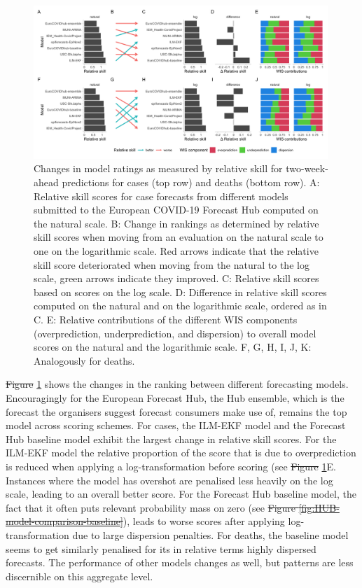 \documentclass[10pt,letterpaper]{article} %
\providecommand{\DIFaddtex}[1]{{\protect\color{blue}\uwave{#1}}} %
\providecommand{\DIFdeltex}[1]{{\protect\color{red}\sout{#1}}}                      %
\providecommand{\DIFaddbegin}{} %
\providecommand{\DIFaddend}{} %
\providecommand{\DIFdelbegin}{} %
\providecommand{\DIFdelend}{} %
\providecommand{\DIFadd}[1]{\texorpdfstring{\DIFaddtex{#1}}{#1}} %
\providecommand{\DIFdel}[1]{\texorpdfstring{\DIFdeltex{#1}}{}} %
\newcommand{\DIFscaledelfig}{0.5}
\newlength{\DIFdelgraphicswidth} %
\newlength{\DIFdelgraphicsheight} %
\newcommand{\DIFaddincludegraphics}[2][]{{\color{blue}\fbox{\DIFOincludegraphics[#1]{#2}}}} %
\newcommand{\DIFdelincludegraphics}[2][]{%
\sbox{\DIFdelgraphicsbox}{\DIFOincludegraphics[#1]{#2}}%
\settoboxwidth{\DIFdelgraphicswidth}{\DIFdelgraphicsbox} %
\settoboxtotalheight{\DIFdelgraphicsheight}{\DIFdelgraphicsbox} %
\scalebox{\DIFscaledelfig}{%
\parbox[b]{\DIFdelgraphicswidth}{\usebox{\DIFdelgraphicsbox}\\[-\baselineskip] \rule{\DIFdelgraphicswidth}{0em}}\llap{\resizebox{\DIFdelgraphicswidth}{\DIFdelgraphicsheight}{%
\setlength{\unitlength}{\DIFdelgraphicswidth}%
\begin{picture}(1,1)%
\thicklines\linethickness{2pt} %
{\color[rgb]{1,0,0}\put(0,0){\framebox(1,1){}}}%
{\color[rgb]{1,0,0}\put(0,0){\line( 1,1){1}}}%
{\color[rgb]{1,0,0}\put(0,1){\line(1,-1){1}}}%
\end{picture}%
}\hspace*{3pt}}} %
} %
\DeclareRobustCommand{\DIFaddbegin}{\DIFOaddbegin \let\includegraphics\DIFaddincludegraphics} %
\DeclareRobustCommand{\DIFaddend}{\DIFOaddend \let\includegraphics\DIFOincludegraphics} %
\DeclareRobustCommand{\DIFdelbegin}{\DIFOdelbegin \let\includegraphics\DIFdelincludegraphics} %
\DeclareRobustCommand{\DIFdelend}{\DIFOaddend \let\includegraphics\DIFOincludegraphics} %
\begin{document}
\begin{figure}[h!]
    \centering
    \includegraphics[width=0.99\textwidth]{../output/figures/HUB-pairwise-comparisons.png}
    \caption{Changes in model ratings as measured by relative skill for two-week-ahead predictions for cases (top row) and deaths (bottom row). A: Relative skill scores for case forecasts from different models submitted to the European COVID-19 Forecast Hub computed on the natural scale. B: Change in rankings as determined by relative skill scores when moving from an evaluation on the natural scale to one on the logarithmic scale. Red arrows indicate that the relative skill score deteriorated when moving from the natural to the log scale, green arrows indicate they improved. C: Relative skill scores based on scores on the log scale. D: Difference in relative skill scores computed on the natural and on the logarithmic scale, ordered as in C. E: Relative contributions of the different WIS components (overprediction, underprediction, and dispersion) to overall model scores on the natural and the logarithmic scale. F, G, H, I, J, K: Analogously for deaths.}
    \label{fig:HUB-rank-order}
\end{figure}

\DIFdelbegin \DIFdel{Figure }\DIFdelend \DIFaddbegin \DIFadd{Fig }\DIFaddend \ref{fig:HUB-rank-order} shows the changes in the ranking between different forecasting models. Encouragingly for the European Forecast Hub, the Hub ensemble, which is the forecast the organisers suggest forecast consumers make use of, remains the top model across scoring schemes. For cases, the ILM-EKF model and the Forecast Hub baseline model exhibit the largest change in relative skill scores. For the ILM-EKF model the relative proportion of the score that is due to overprediction is reduced when applying a log-transformation before scoring (see \DIFdelbegin \DIFdel{Figure }\DIFdelend \DIFaddbegin \DIFadd{Fig }\DIFaddend \ref{fig:HUB-rank-order}E. Instances where the model has overshot are penalised less heavily on the log scale, leading to an overall better score. For the Forecast Hub baseline model, the fact that it often puts relevant probability mass on zero (see \DIFdelbegin \DIFdel{Figure \ref{fig:HUB-model-comparison-baseline}}\DIFdelend \DIFaddbegin {}\DIFaddend ), leads to worse scores after applying log-transformation due to large dispersion penalties. For deaths, the baseline model seems to get similarly penalised for its in relative terms highly dispersed forecasts. The performance of other models changes as well, but patterns are less discernible on this aggregate level. 
\end{document}
